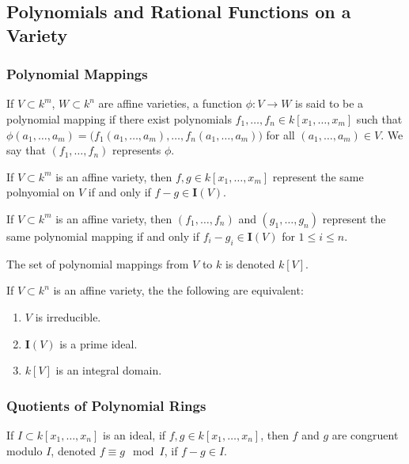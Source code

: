 \documentclass[../main.tex]{subfiles}
\begin{document}
\subsection{Polynomials and Rational Functions on a Variety}
%
\subsubsection{Polynomial Mappings}
%
\begin{definition}
If $V\subset k^m$, $W\subset k^n$ are affine varieties, a function $\phi:V\rightarrow W$ is said to be a polynomial mapping if there exist polynomials $f_1,\hdots, f_n\in k[x_1,\hdots, x_m]$ such that $\phi(a_1,\hdots, a_m) = \big(f_1(a_1,\hdots, a_m),\hdots, f_n(a_1,\hdots, a_m)\big)$ for all $(a_1,\hdots, a_m) \in V$. We say that $(f_1,\hdots, f_n)$ represents $\phi$.
\end{definition}

\begin{theorem}
If $V\subset k^m$ is an affine variety, then $f,g\in k[x_1,\hdots, x_m]$ represent the same polnyomial on $V$ if and only if $f-g \in \textbf{I}(V)$.
\end{theorem}

\begin{theorem}
If $V\subset k^m$ is an affine variety, then $(f_1,\hdots, f_n)$ and $(g_1,\hdots, g_n)$ represent the same polynomial mapping if and only if $f_i-g_i \in \textbf{I}(V)$ for $1\leq i \leq n$.
\end{theorem}

\begin{notation}
The set of polynomial mappings from $V$ to $k$ is denoted $k[V]$.
\end{notation}

\begin{theorem}
If $V\subset k^n$ is an affine variety, the the following are equivalent:
\begin{enumerate}
\item $V$ is irreducible.
\item $\textbf{I}(V)$ is a prime ideal.
\item $k[V]$ is an integral domain.
\end{enumerate}
\end{theorem}
%
\subsubsection{Quotients of Polynomial Rings}
%
\begin{definition}
If $I\subset k[x_1,\hdots ,x_n]$ is an ideal, if $f,g\in k[x_1,\hdots ,x_n]$, then $f$ and $g$ are congruent modulo $I$, denoted $f \equiv g \mod I$, if $f-g \in I$.
\end{definition}
\end{document}
